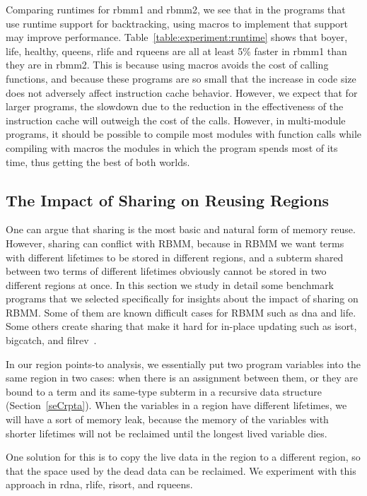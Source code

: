 \documentclass{tlp}
\newcommand{\bench}[1]{{#1}}
\begin{document}
Comparing runtimes for rbmm1 and rbmm2,
we see that in the programs that use runtime support for backtracking,
using macros to implement that support may improve performance.
Table~\ref{table:experiment:runtime} shows that
\bench{boyer}, \bench{life}, \bench{healthy},
\bench{queens}, \bench{rlife} and \bench{rqueens}
are all at least 5\% faster in rbmm1 than they are in rbmm2.
This is because using macros avoids the cost of calling functions,
and because these programs are so small
that the increase in code size
does not adversely affect instruction cache behavior.
However, we expect that for larger programs,
the slowdown due to the reduction in the effectiveness of the instruction cache
will outweigh the cost of the calls.
However, in multi-module programs,
it should be possible to compile most modules with function calls
while compiling with macros
the modules in which the program spends most of its time,
thus getting the best of both worlds.

\subsection{The Impact of Sharing on Reusing Regions}
\label{seCevalSharing}

One can argue that sharing is the most basic and natural form of memory reuse.
However, sharing can conflict with RBMM,
because in RBMM we want terms with different lifetimes
to be stored in different regions,
and a subterm shared between two terms of different lifetimes
obviously cannot be stored in two different regions at once.
In this section we study in detail some benchmark programs
that we selected specifically for insights about the impact of sharing on RBMM.
Some of them are known difficult cases for RBMM
such as \bench{dna} and \bench{life}.
Some others create sharing that make it hard for in-place updating
such as \bench{isort}, \bench{bigcatch},
and \bench{filrev}~\cite{Aspinall08usageaspect}.

In our region points-to analysis,
we essentially put two program variables into the same region in two cases:
when there is an assignment between them,
or they are bound to a term and its same-type subterm
in a recursive data structure (Section~\ref{seCrpta}).
When the variables in a region have different lifetimes,
we will have a sort of memory leak,
because the memory of the variables with shorter lifetimes
will not be reclaimed until the longest lived variable dies.

One solution for this is to
copy the live data in the region to a different region,
so that the space used by the dead data can be reclaimed.
We experiment with this approach in \bench{rdna},
\bench{rlife}, \bench{risort}, and \bench{rqueens}.
\end{document}
